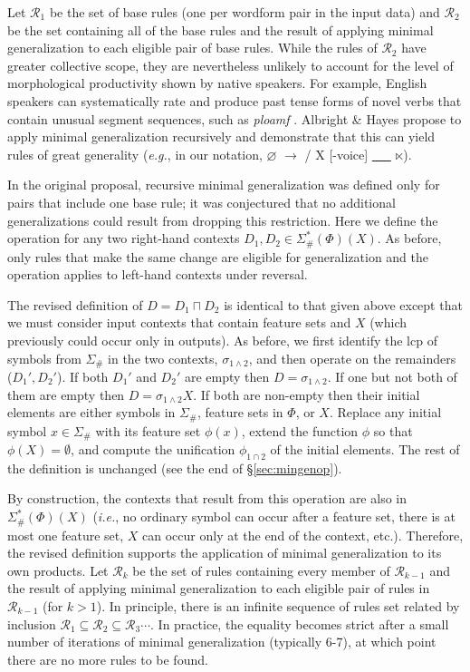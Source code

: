 \documentclass[11pt]{article}
\begin{document}
Let $\mathcal{R}_1$ be the set of base rules (one per wordform pair in the input data) and $\mathcal{R}_2$ be the set containing all of the base rules and the result of applying minimal generalization to each eligible pair of base rules. While the rules of $\mathcal{R}_2$ have greater collective scope, they are nevertheless unlikely to account for the level of morphological productivity shown by native speakers. For example, English speakers can systematically rate and produce past tense forms of novel verbs that contain unusual segment sequences, such as \emph{ploamf}  \citep[\emph{e.g.},][]{prasada1993}. Albright \& Hayes propose to apply minimal generalization recursively and demonstrate that this can yield rules of great generality (\emph{e.g.}, in our notation, $\varnothing$ $\to$  / X [-voice] \underline{\ \ \ } $\ltimes$).

In the original proposal, recursive minimal generalization was defined only for pairs that include one base rule; it was conjectured that no additional generalizations could result from dropping this restriction. Here we define the operation for any two right-hand contexts $D_1, D_2 \in \Sigma_{\#}^*(\Phi)(X)$. As before, only rules that make the same change are eligible for generalization and the operation applies to left-hand contexts under reversal.

The revised definition of $D = D_1 \sqcap D_2$ is identical to that given above except that we must consider input contexts that contain feature sets and $X$ (which previously could occur only in outputs). As before, we first identify the lcp of symbols from $\Sigma_{\#}$ in the two contexts, $\sigma_{1\land 2}$, and then operate on the remainders ($D_1', D_2'$). If both $D_1'$ and $D_2'$ are empty then $D = \sigma_{1\land2}$. If one but not both of them are empty then $D = \sigma_{1\land2}X$. If both are non-empty then their initial elements are either symbols in $\Sigma_{\#}$, feature sets in $\Phi$, or $X$. Replace any initial symbol $x \in \Sigma_{\#}$ with its feature set $\phi(x)$, extend the function $\phi$ so that $\phi(X) = \emptyset$, and compute the unification $\phi_{1\cap2}$ of the initial elements. The rest of the definition is unchanged (see the end of \S\ref{sec:mingenop}). 

By construction, the contexts that result from this operation are also in $\Sigma_{\#}^*(\Phi)(X)$ (\emph{i.e.}, no ordinary symbol can occur after a feature set, there is at most one feature set, $X$ can occur only at the end of the context, etc.). Therefore, the revised definition supports the application of minimal generalization to its own products. Let $\mathcal{R}_{k}$ be the set of rules containing every member of $\mathcal{R}_{k-1}$ and the result of applying minimal generalization to each eligible pair of rules in $\mathcal{R}_{k-1}$ (for $k > 1$). In principle, there is an infinite sequence of rules set related by inclusion $\mathcal{R}_1 \subseteq \mathcal{R}_2 \subseteq \mathcal{R}_3 \cdots$. In practice, the equality becomes strict after a small number of iterations of minimal generalization (typically 6-7), at which point there are no more rules to be found.
\end{document}
